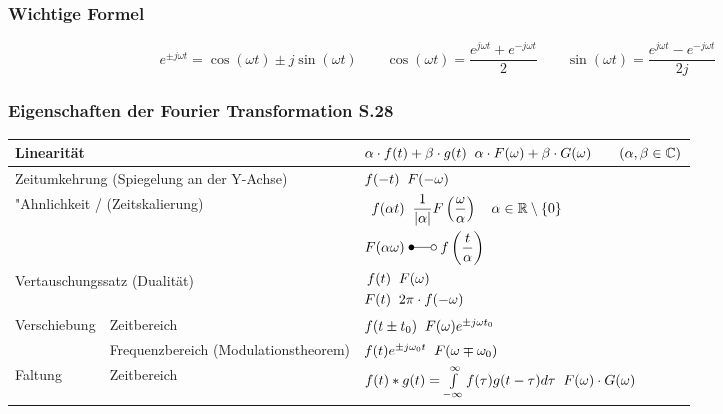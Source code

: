 \subsubsection{Wichtige Formel}
\[e^{\pm j\omega t} = \cos(\omega t) \pm j\sin(\omega t) \qquad 
\cos(\omega t) = \frac{e^{j\omega t} + e^{-j\omega t}}{2} \qquad
\sin(\omega t) = \frac{e^{j\omega t} - e^{-j\omega t}}{2j}\]


\subsubsection{Eigenschaften der Fourier Transformation S.28}
\renewcommand{\arraystretch}{2}
\begin{tabular}{|p{2.5cm}|p{6cm}|p{8.5cm}|}
	\hline
	\multicolumn{2}{|l}{Linearität} & $\alpha\cdot f(t) + \beta\cdot g(t) \; \relax \; \alpha\cdot F(\omega) +\beta\cdot G(\omega) \qquad (\alpha, \beta \in \mathbb{C})$  \\ 
	\hline
	\multicolumn{2}{|l}{Zeitumkehrung (Spiegelung an der Y-Achse)} & $f(-t) \; \relax \; F(-\omega)$ \\
	\hline
	\multicolumn{2}{|l}{"Ahnlichkeit / (Zeitskalierung)}             &      		$\begin{aligned}f(\alpha t) \; &\laplace \; \frac{1}{|\alpha|}F \left (\frac{\omega}{\alpha} \right)
		\quad\alpha \in\mathbb{R}\setminus \{0\}\\
		F(\alpha\omega) \; &\Laplace \; f\left(\frac{t}{\alpha}\right)\end{aligned}$\\ 
	\hline
	\multicolumn{2}{|l}{Vertauschungssatz (Dualität)}              & 
	\begin{math}
		\begin{aligned}
			f(t) \; &\relax \; F(\omega)\nonumber \\ 
			F(t) \; &\relax \; 2\pi \cdot f(-\omega)
		\end{aligned}
	\end{math}\\ 
	\hline
	\hline
	\multirow{2}{*}{Verschiebung} & Zeitbereich & $f(t\pm t_0) \; \relax \; F(\omega)e^{\pm j\omega t_0}$ \\ 
	\cline{2-3} 
	& Frequenzbereich (Modulationstheorem) & $f(t)e^{\pm j\omega_0 t} \; \relax \; F(\omega\mp\omega_0)$ \\ 
	\hline
	\hline
	\multirow{2}{*}{Faltung} & Zeitbereich & $f(t) \ast g(t) = \int\limits_{-\infty}^{\infty} f(\tau)g(t-\tau)d\tau \; \relax \;
	F(\omega) \cdot G(\omega)$ \\ 

\end{tabular}
